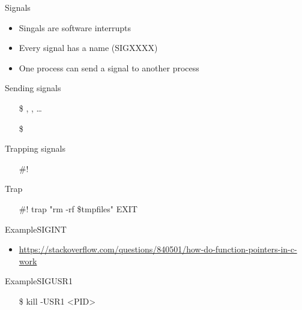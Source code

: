 \begin{frame}{Signals}
  \begin{itemize}
  \item Singals are software interrupts
  \item Every signal has a name (SIGXXXX)
  \item One process can send a signal to another process
  \end{itemize}
  \begin{block}{Sending signals}
    \begin{itemize}
    \item[\$] \Cc, \Cz, \ldots
    \item[\$] 
    \end{itemize}
  \end{block}
  \begin{block}{Trapping signals}
    \begin{itemize}
    \item[\#!] 
    \end{itemize}
  \end{block}
\end{frame}

\begin{frame}{Trap}
  \begin{center}
  \end{center}\ttfamily
  \begin{itemize}
  \item[\#!] trap "rm -rf \$tmpfiles" EXIT
  \end{itemize}
\end{frame}

\begin{frame}{Example}{SIGINT}
\begin{center}
\end{center}
\end{frame}

\begin{itemize}
\item \url{https://stackoverflow.com/questions/840501/how-do-function-pointers-in-c-work}
\end{itemize}

\begin{frame}{Example}{SIGUSR1}
  \begin{minipage}{.5\linewidth}
  \end{minipage}\quad
  \begin{minipage}{.4\linewidth}\ttfamily
    \begin{itemize}
    \item[\$] kill -USR1 <PID>
    \end{itemize}
  \end{minipage}
\end{frame}

